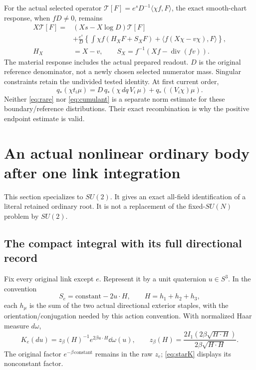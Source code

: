 \documentclass[11pt,letterpaper]{article}
\theoremstyle{remark}\newtheorem{remark}[theorem]{Remark}
\newcommand{\diver}{\operatorname{div}}\newcommand{\Ad}{\operatorname{Ad}}
\providecommand{\mathscr}{\mathcal}
\begin{document}
For the actual selected operator
\(\mathscr T[F]=e^sD^{-1}\langle\chi f,F\rangle\),
the exact smooth-chart response, when \(fD\ne0\), remains
\begin{align}\label{eq:response}
 X\mathscr T[F]
 ={}&(Xs-X\log D)\mathscr T[F]\\
 &+\frac{e^s}{D}
 \left\{\int\chi f(H_XF+S_XF)
 +\langle f(X\chi-v\chi),F\rangle\right\},\nonumber\\
 H_X&=X-v,\qquad S_X=f^{-1}(Xf-\diver(fv)).\nonumber
\end{align}
The material response includes the actual prepared readout. \(D\) is the original reference denominator, not a newly chosen selected numerator mass. Singular constraints retain the undivided tested identity.
At first current order,
\[
 q_*(\chi t_i\mu)
 =D\,q_*(\chi\,dq\,V_i\,\mu)+q_*((V_i\chi)\mu).
\]
Neither \eqref{eq:rare} nor \eqref{eq:cumulant} is a separate norm estimate for these boundary/reference distributions. Their exact recombination is why the positive endpoint estimate is valid.

\section{An actual nonlinear ordinary body after one link integration}

This section specializes to \(SU(2)\). It gives an exact all-field identification of a literal retained ordinary root. It is not a replacement of the fixed-\(SU(N)\) problem by \(SU(2)\).

\subsection{The compact integral with its full directional record}

Fix every original link except \(e\). Represent it by a unit quaternion \(u\in S^3\). In the convention
\[
 S_e=\text{constant}-2u\cdot H,\qquad
 H=h_1+h_2+h_3,
\]
each \(h_\mu\) is the sum of the two actual directional exterior staples, with the orientation/conjugation needed by this action convention. With normalized Haar measure \(d\omega\),
\begin{equation}\label{eq:starK}
 K_e(du)=z_\beta(H)^{-1}e^{2\beta u\cdot H}\dd\omega(u),\qquad
 z_\beta(H)=\frac{2I_1(2\beta\sqrt{H\cdot H})}{2\beta\sqrt{H\cdot H}}.
\end{equation}
The original factor \(e^{-\beta\,\mathrm{constant}}\) remains in the raw \(z_e\); \eqref{eq:starK} displays its nonconstant factor.
\end{document}
